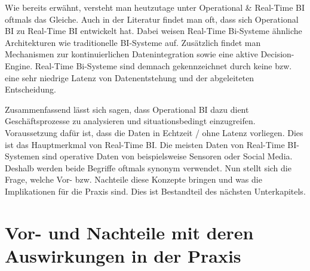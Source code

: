 Wie bereits erwähnt, versteht man heutzutage unter Operational \& Real-Time BI oftmals das Gleiche. Auch in der Literatur findet man oft, dass sich Operational BI zu Real-Time BI entwickelt hat. \autocite[Vgl.][S. 36]{Sandu2008} Dabei weisen Real-Time Bi-Systeme ähnliche Architekturen wie traditionelle BI-Systeme auf. Zusätzlich findet man Mechanismen zur kontinuierlichen Datenintegration sowie eine aktive Decision-Engine. \autocite[Vgl.][S. 96]{chaud} Real-Time Bi-Systeme sind demnach gekennzeichnet durch keine bzw. eine sehr niedrige Latenz von Datenentstehung und der abgeleiteten Entscheidung.

Zusammenfassend lässt sich sagen, dass Operational BI dazu dient Geschäftsprozesse zu analysieren und situationsbedingt einzugreifen. Voraussetzung dafür ist, dass die Daten in Echtzeit / ohne Latenz vorliegen. Dies ist das Hauptmerkmal von Real-Time BI. Die meisten Daten von Real-Time BI-Systemen sind operative Daten von beispielsweise Sensoren oder Social Media. Deshalb werden beide Begriffe oftmals synonym verwendet. Nun stellt sich die Frage, welche Vor- bzw. Nachteile diese Konzepte bringen und was die Implikationen für die Praxis sind. Dies ist Bestandteil des nächsten Unterkapitels.

\section{Vor- und Nachteile mit deren Auswirkungen in der Praxis}
